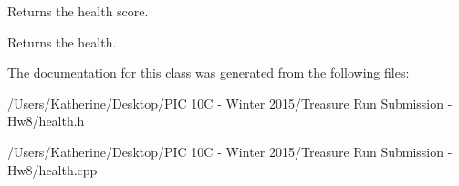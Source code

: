 Returns the health score. 

Returns the health. 

The documentation for this class was generated from the following files\+:\begin{DoxyCompactItemize}
\item 
/\+Users/\+Katherine/\+Desktop/\+P\+I\+C 10\+C -\/ Winter 2015/\+Treasure Run Submission -\/ Hw8/health.\+h\item 
/\+Users/\+Katherine/\+Desktop/\+P\+I\+C 10\+C -\/ Winter 2015/\+Treasure Run Submission -\/ Hw8/health.\+cpp\end{DoxyCompactItemize}

